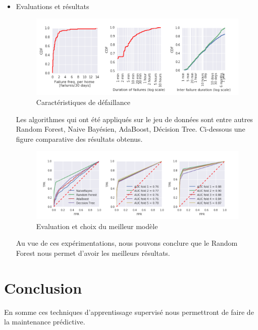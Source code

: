\begin{itemize}[label=\textbullet, font=\LARGE \color{black}]
\item Evaluations et résultats
\newline
\begin{figure}[h]
\begin{center}
\includegraphics[scale=0.80]{Feature_2.png}
\caption[Caractéristiques de défaillance]{Caractéristiques de défaillance}
\label{monlabel}
\end{center}
\end{figure}
Les algorithmes qui ont été appliqués sur le jeu de données sont entre autres Random Forest, Naive Bayésien, AdaBoost, Décision Tree.
Ci-dessous une figure comparative des résultats obtenus.
\begin{figure}[h]
\includegraphics[scale=0.80]{Evaluation.png}
\caption[Evaluation et choix du meilleur modèle]{Evaluation et choix du meilleur modèle}
\label{monlabel}
\end{figure}
Au vue de ces expérimentations, nous pouvons conclure que le Random Forest nous permet d'avoir les meilleurs résultats.

\end{itemize}

\section{Conclusion}
En somme ces techniques d'apprentissage supervisé nous permettront de faire de la maintenance prédictive.